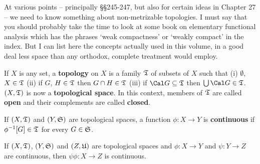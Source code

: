 
\def\varBbb#1{\mathchoice{\hbox{$\Bbb#1$\hskip0.02em}}
  {\hbox{$\Bbb#1$\hskip0.02em}}
  {\hbox{$\scriptstyle\Bbb#1$\hskip0.04em}}
  {\hbox{$\scriptscriptstyle\Bbb#1$\hskip0.04em}}}

\def\chaptername{Appendix}
\def\sectionname{General topology}


At various points -- principally \S\S245-247, %
but also for certain
ideas in Chapter 27 -- we need to know something about non-metrizable
topologies.   I must say that you should probably
take the time to look at some book on elementary functional analysis
which has the phrases `weak compactness' or `weakly compact' in the
index.   But I can
list here the concepts actually used in this volume, in a good deal less
space than any orthodox, complete treatment would employ.

    If $X$ is
any set, a {\bf topology} on $X$ is a family $\frak T$ of subsets of $X$
such that (i) $\emptyset$, $X\in\frak T$ (ii) if $G$, $H\in\frak T$ then
$G\cap H\in\frak T$ (iii) if $\Cal G\subseteq\frak T$ then
$\bigcup\Cal G\in\frak T$.    $(X,\frak T)$ is now a
{\bf topological space}.   In this context, members of $\frak T$ are
called {\bf open} and their complements are called
{\bf closed}.

 If $(X,\frak T)$ and $(Y,\frak
S)$ are topological spaces, a
function $\phi:X\to Y$ is {\bf continuous} if $\phi^{-1}[G]\in\frak T$
for every $G\in\frak S$.   

 If $(X,\frak T)$, $(Y,\frak S)$ and
$(Z,\frak U)$ are topological spaces
and $\phi:X\to Y$ and $\psi:Y\to Z$ are continuous, then
$\psi\phi:X\to Z$
is continuous.   

